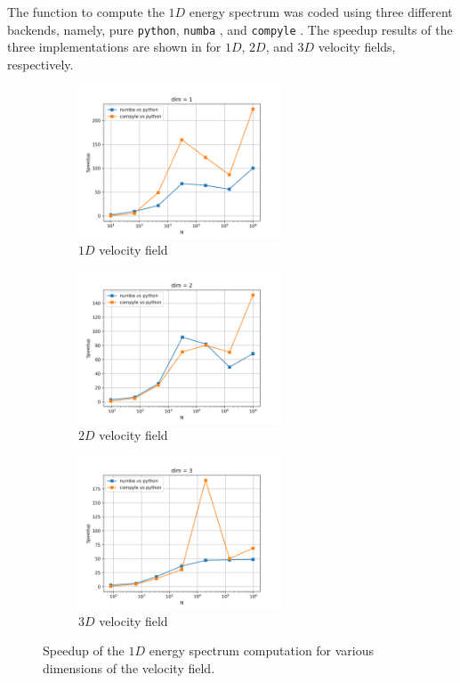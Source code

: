 The function to compute the $1D$ energy spectrum was coded using three different backends, namely, pure \texttt{python}, \texttt{numba} \parencite{Lam_Pitrou_Seibert_2015}, and \texttt{compyle} \parencite{compyle_pr_ab-proc-scipy-2020}.
The speedup results of the three implementations are shown in  for $1D$, $2D$, and $3D$ velocity fields, respectively.

\begin{figure}[H]
    \begin{subfigure}{7cm}
      \centering\includegraphics[width=6cm]{Code-Figures/espec_speedup_dim_1.png}
      \caption{$1D$ velocity field}
    \end{subfigure}
    \begin{subfigure}{7cm}
      \centering\includegraphics[width=6cm]{Code-Figures/espec_speedup_dim_2.png}
      \caption{$2D$ velocity field}
    \end{subfigure}
    \begin{subfigure}{7cm}
      \centering\includegraphics[width=6cm]{Code-Figures/espec_speedup_dim_3.png}
      \caption{$3D$ velocity field}
    \end{subfigure}
    \caption{Speedup of the $1D$ energy spectrum computation for various dimensions of the velocity field.}
    \label{fig:espec-speedup}
\end{figure}

